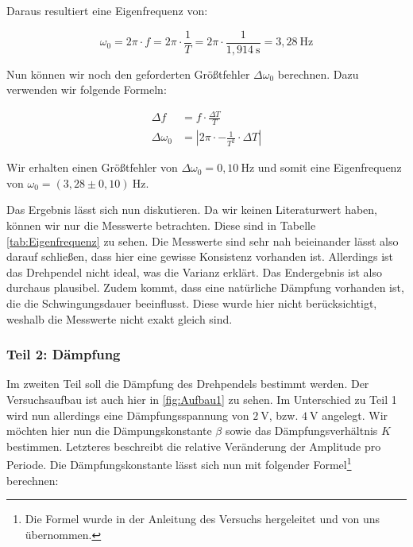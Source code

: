             Daraus resultiert eine Eigenfrequenz von:

            \begin{equation}
                \omega_{0} = 2 \pi \cdot f = 2 \pi \cdot \frac{1}{T} = 2 \pi \cdot \frac{1}{1,914\ \mathrm{s}} = 3,28\ \mathrm{Hz}
                \label{eq:Eigenfrequenz}
            \end{equation}

            Nun können wir noch den geforderten Größtfehler $\Delta \omega_{0}$ berechnen. Dazu verwenden wir folgende Formeln:

            \begin{equation}
                \begin{aligned}
                \Delta f &= f \cdot \frac{\Delta T}{T}\\
                \Delta \omega_{0} &= \left|2 \pi \cdot -\frac{1}{T^{2}} \cdot \Delta T\right|
                \end{aligned}
                \label{eq:Größtfehler}
            \end{equation}

            Wir erhalten einen Größtfehler von $\Delta \omega_{0} = 0,10\ \mathrm{Hz}$ und somit eine Eigenfrequenz von $\omega_{0} = (3,28 \pm 0,10)\ \mathrm{Hz}$.

            Das Ergebnis lässt sich nun diskutieren. Da wir keinen Literaturwert haben, können wir nur die Messwerte betrachten. Diese sind in Tabelle \ref{tab:Eigenfrequenz} zu sehen. Die Messwerte sind sehr nah beieinander lässt also darauf schließen, dass hier eine gewisse Konsistenz vorhanden ist. Allerdings ist das Drehpendel nicht ideal, was die Varianz erklärt. Das Endergebnis ist also durchaus plausibel. Zudem kommt, dass eine natürliche Dämpfung vorhanden ist, die die Schwingungsdauer beeinflusst. Diese wurde hier nicht berücksichtigt, weshalb die Messwerte nicht exakt gleich sind.

        \subsubsection{Teil 2: Dämpfung}
        
            Im zweiten Teil soll die Dämpfung des Drehpendels bestimmt werden. Der Versuchsaufbau ist auch hier in \ref{fig:Aufbau1} zu sehen. Im Unterschied zu Teil 1 wird nun allerdings eine Dämpfungsspannung von $2\ \mathrm{V}$, bzw. $4\ \mathrm{V}$ angelegt. Wir möchten hier nun die Dämpungskonstante $\beta$ sowie das Dämpfungsverhältnis $K$ bestimmen. Letzteres beschreibt die relative Veränderung der Amplitude pro Periode. Die Dämpfungskonstante lässt sich nun mit folgender Formel\footnote[1]{Die Formel wurde in der Anleitung des Versuchs hergeleitet und von uns übernommen.} berechnen:

